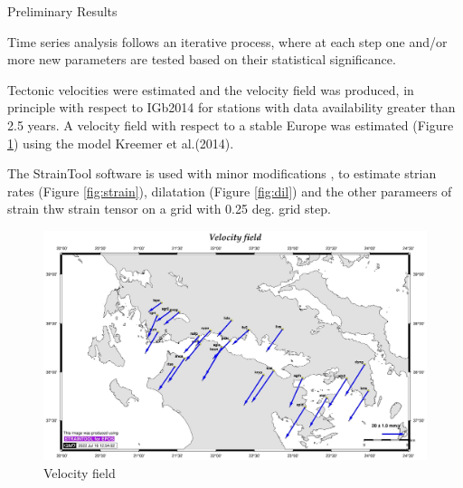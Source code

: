 \documentclass[final,a0,portrait]{beamer}
\newlength{\onecolwid}
\begin{document}
\begin{frame}[t]
\begin{columns}[t]
\begin{column}{\onecolwid}

\begin{block}{Preliminary Results}
{\small
Time series analysis follows an iterative process, where at each step one and/or more new parameters are tested based on their statistical significance.

Tectonic velocities were estimated and the velocity field was produced, in principle with respect to IGb2014 for stations with data availability greater than 2.5 years. A velocity field with respect to a stable Europe was estimated (Figure \ref{fig:crvels}) using the model Kreemer et al.(2014)\cite{kreemer14}.

The StrainTool software is used with minor modifications \cite{straintool}, to estimate strian rates (Figure \ref{fig:strain}), dilatation (Figure \ref{fig:dil}) and the other parameers of strain thw strain tensor on a grid with 0.25 deg. grid step.

\begin{figure}
  \centering
  \includegraphics[width=1\onecolwid]{gsg2022_vel.jpg}
  \caption{Velocity field}
  \label{fig:crvels}
\end{figure}

}
\end{block}
\end{column}
\end{columns}
\end{frame}
\end{document}
